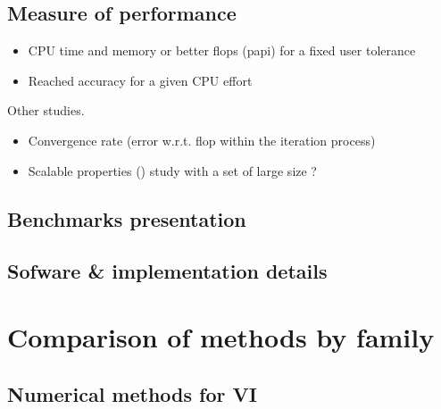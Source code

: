 \subsection{Measure of performance}
\begin{itemize}
\item CPU time and memory or better flops (papi) for a fixed user tolerance
\item Reached accuracy for a given CPU effort
\end{itemize}
Other studies.
\begin{itemize}
\item Convergence rate (error w.r.t. flop within the iteration process)
\item Scalable properties () study with a set of large size ?
\end{itemize}

\subsection{Benchmarks presentation}

\subsection{Sofware \& implementation details}
\clearpage


\section{Comparison of methods by family}

\subsection{Numerical methods for VI}

